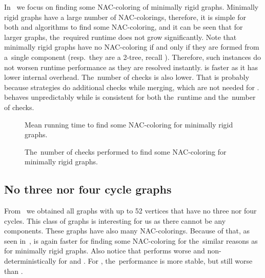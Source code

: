 In~
we focus on finding some NAC-coloring of minimally rigid graphs.
%
Minimally rigid graphs have a large number of NAC-colorings,
therefore, it is simple for both \NaiveCycles{}
and \Subgraphs{} algorithms to find some NAC-coloring,
and it can be seen that for larger graphs, the~required runtime
does not grow significantly.
%
Note that minimally rigid graphs have no NAC-coloring if and only if they are formed from
a~single \trcon{} component (resp.\ they are a 2-tree, recall ).
Therefore, such instances do not worsen runtime performance as they are resolved instantly.
%
\NaiveCycles{} is faster as it has lower internal overhead.
The~number of \IsNACColoring{} checks is also lower.
That is probably because \Subgraphs{} strategies do additional checks
while merging, which are not needed for \NaiveCycles{}.
\SharedVertices{} behaves unpredictably while \MergeLinear{} is consistent
for both the~runtime and the~number of \IsNACColoring{} checks.

\begin{figure}[thbp]
	\centering
	\scalebox{\BenchFigureScale}{}
	\caption[Mean runtime for minimally rigid graphs (some)]{
		Mean running time to find some NAC-coloring for minimally rigid graphs.}%
	\label{fig:graph_minimally_rigid_first_runtime}
\end{figure}%
\begin{figure}[thbp]
	\centering
	\scalebox{\BenchFigureScale}{}
	\caption[Checks performed for minimally rigid graphs (some)]{
		The~number of checks performed to find some NAC-coloring for minimally rigid graphs.}%
	\label{fig:graph_minimally_rigid_first_checks}
\end{figure}%



\subsection*{No three nor four cycle graphs}

From~\cite{extremal_graphs} we obtained all graphs with up to 52 vertices
that have no three nor four cycles. This class of graphs is interesting for us
as there cannot be any \trcon{} components.
These graphs have also many NAC-colorings.
Because of that, as seen in~,
\NaiveCycles{} is again faster for finding some NAC-coloring
for the~similar reasons as for minimally rigid graphs.
%
Also notice that \SharedVertices{} performs worse and non-deterministically
for \CyclesMatchChunks{} and \None{}.
For \Neighbors{}, the~performance is more stable, but still worse than \MergeLinear{}.

